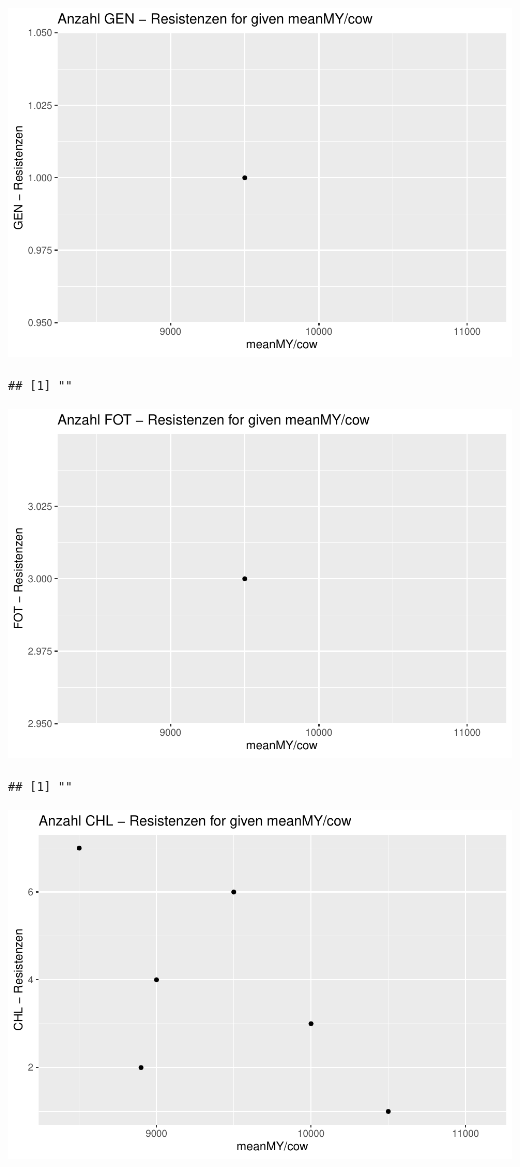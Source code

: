 \documentclass[
]{article}
\begin{document}
\includegraphics{NResistenzen_files/figure-latex/numerical_variables-4.pdf}

\begin{verbatim}
## [1] ""
\end{verbatim}

\includegraphics{NResistenzen_files/figure-latex/numerical_variables-5.pdf}

\begin{verbatim}
## [1] ""
\end{verbatim}

\includegraphics{NResistenzen_files/figure-latex/numerical_variables-6.pdf}
\end{document}
